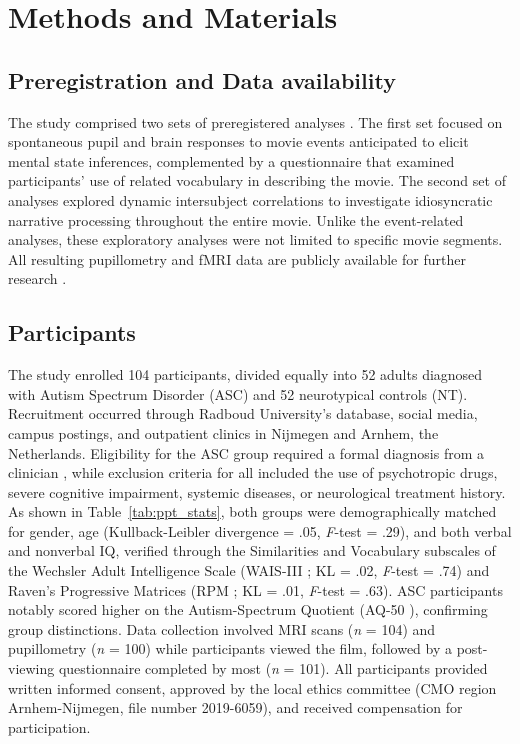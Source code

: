 \section*{Methods and Materials}
\subsection*{Preregistration and Data availability}
The study comprised two sets of preregistered analyses \citep{mangnus2022}. The first set focused on spontaneous pupil and brain responses to movie events anticipated to elicit mental state inferences, complemented by a questionnaire that examined participants' use of related vocabulary in describing the movie. The second set of analyses explored dynamic intersubject correlations to investigate idiosyncratic narrative processing throughout the entire movie. Unlike the event-related analyses, these exploratory analyses were not limited to specific movie segments. All resulting pupillometry and fMRI data are publicly available for further research \citep{mangnus2024dataset}.

\subsection*{Participants}
The study enrolled 104 participants, divided equally into 52 adults diagnosed with Autism Spectrum Disorder (ASC) and 52 neurotypical controls (NT). Recruitment occurred through Radboud University's database, social media, campus postings, and outpatient clinics in Nijmegen and Arnhem, the Netherlands. Eligibility for the ASC group required a formal diagnosis from a clinician \citep{apa2013}, while exclusion criteria for all included the use of psychotropic drugs, severe cognitive impairment, systemic diseases, or neurological treatment history. As shown in Table~\ref{tab:ppt_stats}, both groups were demographically matched for gender, age (Kullback-Leibler divergence = .05, \textit{F}-test = .29), and both verbal and nonverbal IQ, verified through the Similarities and Vocabulary subscales of the Wechsler Adult Intelligence Scale (WAIS-III \citep{wechsler1997}; KL = .02, \textit{F}-test = .74) and Raven's Progressive Matrices (RPM \citep{raven1989}; KL = .01, \textit{F}-test = .63). ASC participants notably scored higher on the Autism-Spectrum Quotient (AQ-50 \citep{baron-cohen2001AQ}), confirming group distinctions. Data collection involved MRI scans (\textit{n} = 104) and pupillometry (\textit{n} = 100) while participants viewed the film, followed by a post-viewing questionnaire completed by most (\textit{n} = 101). All participants provided written informed consent, approved by the local ethics committee (CMO region Arnhem-Nijmegen, file number 2019-6059), and received compensation for participation.

